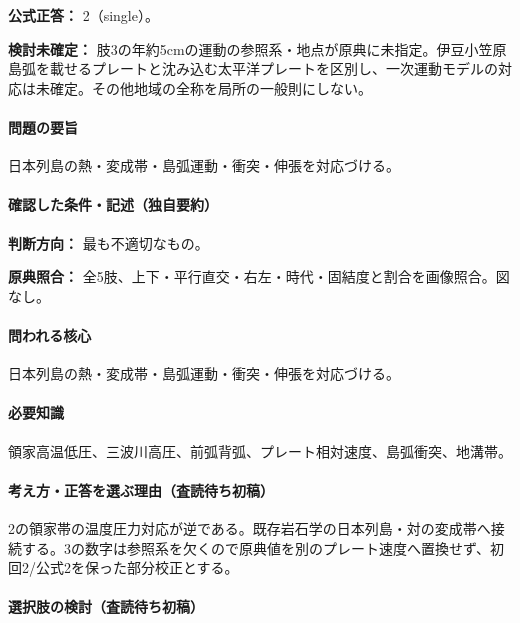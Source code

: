 \textbf{公式正答：} 2（single）。

\par\textbf{検討未確定：} 肢3の年約5cmの運動の参照系・地点が原典に未指定。伊豆小笠原島弧を載せるプレートと沈み込む太平洋プレートを区別し、一次運動モデルの対応は未確定。その他地域の全称を局所の一般則にしない。

\paragraph{問題の要旨} 日本列島の熱・変成帯・島弧運動・衝突・伸張を対応づける。

\paragraph{確認した条件・記述（独自要約）}\mbox{}\par

\noindent\textbf{判断方向：} 最も不適切なもの。\par

\noindent\textbf{原典照合：} 全5肢、上下・平行直交・右左・時代・固結度と割合を画像照合。図なし。\par

\paragraph{問われる核心} 日本列島の熱・変成帯・島弧運動・衝突・伸張を対応づける。

\paragraph{必要知識} 領家高温低圧、三波川高圧、前弧背弧、プレート相対速度、島弧衝突、地溝帯。

\paragraph{考え方・正答を選ぶ理由（査読待ち初稿）} 2の領家帯の温度圧力対応が逆である。既存岩石学の日本列島・対の変成帯へ接続する。3の数字は参照系を欠くので原典値を別のプレート速度へ置換せず、初回2/公式2を保った部分校正とする。

\paragraph{選択肢の検討（査読待ち初稿）}\mbox{}\par


